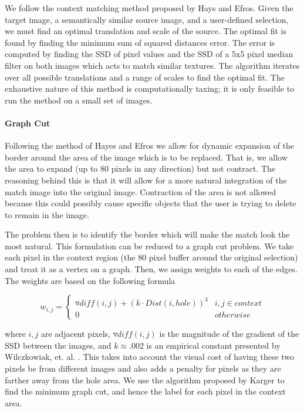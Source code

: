 \documentclass[11pt]{amsart}
\begin{document}
We follow the context matching method proposed by Hays and Efros.\cite{Hays:2007} Given the target image, a semantically similar source image, and a user-defined selection, we must find an optimal translation and scale of the source. The optimal fit is found by finding the minimum sum of squared distances error. The error is computed by finding the SSD of pixel values and the SSD of a 5x5 pixel median filter on both images which acts to match similar textures. The algorithm iterates over all possible translations and a range of scales to find the optimal fit. The exhaustive nature of this method is computationally taxing; it is only feasible to run the method on a small set of images.


\paragraph{\sc Graph Cut}

Following the method of Hayes and Efros \cite{Hays:2007} we allow for dynamic expansion of the border around the area of the image which is to be replaced. That is, we allow the area to expand (up to 80 pixels in any direction) but not contract. The reasoning behind this is that it will allow for a more natural integration of the match image into the original image. Contraction of the area is not allowed because this could possibly cause specific objects that the user is trying to delete to remain in the image. 


The problem then is to identify the border which will make the match look the most natural. This formulation can be reduced to a graph cut problem. We take each pixel in the context region (the 80 pixel buffer around the original selection) and treat it as a vertex on a graph. Then, we assign weights to each of the edges. The weights are based on the following formula

\begin{displaymath}
	w_{i,j} = \left\{ 
		\begin{array}{lr}
			\triangledown diff(i,j) + (k \cdot Dist(i,hole))^3 &  i,j \in context \\
			0 &  otherwise
		\end{array}
	\right.
\end{displaymath}

where $i,j$ are adjacent pixels, $\triangledown diff(i,j)$ is the magnitude of the gradient of the SSD between the images, and $k \approx .002$ is an empirical constant presented by Wilczkowiak, et. al. \cite{Gabriel:2005}. This takes into account the visual cost of having these two pixels be from different images and also adds a penalty for pixels as they are farther away from the hole area. We use the algorithm proposed by Karger \cite{Karger:1992} to find the minimum graph cut, and hence the label for each pixel in the context area.
\end{document}
